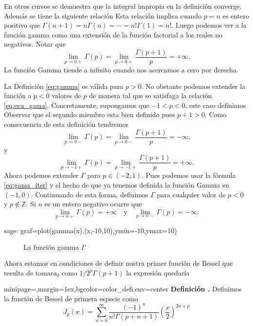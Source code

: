 \documentclass{article}
\newenvironment{colbox}[2]{%
    \begin{adjustbox}{minipage={\linewidth},margin=1ex,bgcolor=#1,env=center}
        #2}{%
    \end{adjustbox}%
}
\newcounter{defi_cont}
\newenvironment{definicion}[1]{\begin{colbox}{color_defi}{\refstepcounter{defi_cont}\textbf{Definición \arabic{defi_cont}.} #1}}{\end{colbox}}
\begin{document}
En otros cursos se demuestra que la integral impropia en la definición converge. Además se tiene la siguiente relación
Esta relación implica cuando $p=n$ es entero positivo que $\Gamma(n+1)=n\Gamma(n)=\cdots=n!\Gamma(1)=n!$. Luego podemos ver a la función gamma como una extensión de la función factorial a los reales no negativos. Notar que
\[\lim_{p\to 0+}\Gamma(p)=\lim_{p\to 0+}\frac{\Gamma(p+1)}{p}=+\infty.\]
La función Gamma tiende a  infinito cuando nos acercamos a cero por derecha.

La Definición \ref{eq:gamma} es válida para $p>0$. No obstante podemos extender la función a $p<0$ valores de $p$ de manera tal que se satisfaga la relación \eqref{eq:ecu_gama}. Concretamente,  supongamos  que $-1<p<0$,  este caso definimos
Observar que el segundo miembro esta bien definido pues $p+1>0$. Como consecuencia de esta definición tendremos
\[\lim_{p\to 0-}\Gamma(p)=\lim_{p\to 0-}\frac{\Gamma(p+1)}{p}=-\infty.\]
y 
\[\lim_{p\to -1+}\Gamma(p)=\lim_{p\to -1+}\frac{\Gamma(p+1)}{p}=+\infty.\] 
Ahora podemos extender $\Gamma$ para $p\in (-2,1)$. Pues  podemos usar la fórmula \eqref{eq:gama_iter} y el hecho de que ya tenemos definida la función Gamma en $(-1,0)$. Continuando de esta forma, definimos $\Gamma$ para cualquier valor de $p<0$ y $p\notin \mathbb{Z}$. Si $n$ es un entero negativo ocurre que
\[\lim_{p\to n+}\Gamma(p)=+\infty\quad\text{y}\quad \lim_{p\to n-}\Gamma(p)=-\infty.\] 

\begin{sagecommandline}
 sage: graf=plot(gamma(x),(x,-10,10),ymin=-10,ymax=10)
\end{sagecommandline}

\begin{figure}[h]
\caption{La función gamma $\Gamma$}
\end{figure}
Ahora estamos en condiciones de definir nustra primer función de Bessel que resulta de tomar$a_0$ como $1/2^p\Gamma(p+1)$ la expresión quedaría

\begin{definicion} Definimos la función de Bessel de primera especie como
\[J_p(x)=\sum_{n=0}^{\infty}\frac{(-1)^n}{n!\Gamma(p+n+1)}\left(\frac{x}{2}\right)^{2n+p}\]
\end{definicion}
\end{document}
